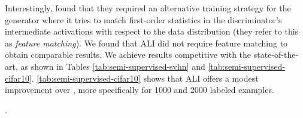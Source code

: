 \documentclass{article}
\begin{document}
Interestingly, \citet{Salimans2016gan} found that they required an alternative
training strategy for the generator where it tries to match first-order
statistics in the discriminator's intermediate activations with respect to the
data distribution (they refer to this as {\em feature matching}). We found that
ALI did not require feature matching to obtain comparable results. We achieve
results competitive with the state-of-the-art, as shown in Tables
\ref{tab:semi-supervised-svhn} and \ref{tab:semi-supervised-cifar10}.
\autoref{tab:semi-supervised-cifar10} shows that ALI offers a modest improvement
over \citet{Salimans2016gan}, more specifically for 1000 and 2000 labeled
examples.

\begin{table}[ht]
\caption{\label{tab:semi-supervised-svhn} SVHN test set missclassification rate}.
\centering
{}
\vspace{0.2cm}
\end{table}

\begin{table}[ht]
\caption{\label{tab:semi-supervised-cifar10} CIFAR10 test set missclassification
    rate for semi-supervised learning using different numbers of trained labeled
    examples. For ALI, error bars correspond to 3 times the standard deviation.}
\centering
{}
\vspace{0.2cm}
\end{table}
\end{document}

